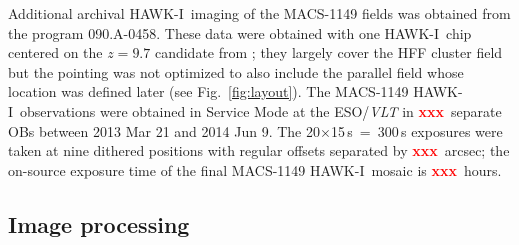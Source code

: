 \documentclass[preprint2]{aastex6}
\gdef\mum{$\mu\mathrm{m}$}
\newcommand\xxx{{\textcolor{red}{\bf xxx}}}
\gdef\HAWKI{\mbox{HAWK-I}}
\begin{document}
\begin{figure*}
\caption{Layout of the Frontier Fields $K_s$-band mosaics.  The positions of the \textit{HST} cluster and parallel fields are shown in the blue (ACS optical) and red (WFC3 IR) polygons.  The light blue polygons in the MACS-0717 field show additional wide-field ACS imaging coverage from  programs GO-9722 and GO-10420 \citep[PI: Ebeling;][]{ma:11}.  The area covered by deep imaging in the \textit{Spitzer}/IRAC 3.6 and 4.5\,\mum\ channels is shown in orange, with the cluster fields indicated by the dashed lines.  The \HAWKI\ field of view is perfectly suited (Abell 2744, MACS-0416, Abell S1063 and Abell 370) for simultaneous imaging of the cluster+parallel field pairs, which require two separate pointings with MOSFIRE (MACS-0717 and MACS-1149).  The footprint of additional archival \HAWKI\ coverage of the MACS-1149 field is indicated by the gray square in the lower right panel.\label{fig:layout}}  
\end{figure*}

Additional archival \HAWKI\ imaging of the MACS-1149 fields was obtained from the program 090.A-0458.  These data were obtained with one \HAWKI\ chip centered on the $z=9.7$ candidate from \cite{zheng:12}; they largely cover the HFF cluster field but the pointing was not optimized to also include the parallel field whose location was defined later (see Fig.~\ref{fig:layout}).  The MACS-1149 \HAWKI\ observations were obtained in Service Mode at the ESO/\textit{VLT} in \xxx\ separate OBs between 2013 Mar 21 and 2014 Jun 9.  The 20$\times$15\,s~=~300\,s exposures were taken at nine dithered positions with regular offsets separated by \xxx\ arcsec; the on-source exposure time of the final MACS-1149 \HAWKI\ mosaic is \xxx\ hours.

\subsection{Image processing}
\label{s:processing}
\end{document}
